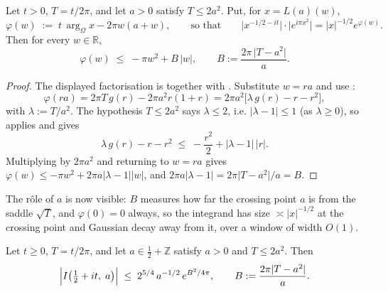 \begin{lemma}
\label{lem:rs_phase_bound}
\leanok
{}
Let $t>0$, $T=t/2\pi$, and let $a>0$ satisfy $T\le2a^{2}$.  Put, for $x=L(a)(w)$,
\[
  \varphi(w)\;:=\;t\,\arg_{\Omega}x-2\pi w(a+w),
  \qquad\text{so that}\qquad
  \bigl|x^{-1/2-it}\bigr|\cdot\bigl|e^{i\pi x^{2}}\bigr|=\lvert x\rvert^{-1/2}e^{\varphi(w)} .
\]
Then for every $w\in\mathbb{R}$,
\[
  \varphi(w)\;\le\;-\pi w^{2}+B\,\lvert w\rvert,
  \qquad B:=\frac{2\pi\,\lvert T-a^{2}\rvert}{a}.
\]
\end{lemma}

\begin{proof}
\leanok
The displayed factorisation is  together with
.  Substitute $w=ra$ and use :
\[
  \varphi(ra)=2\pi T\,g(r)-2\pi a^{2}r(1+r)
  =2\pi a^{2}\bigl[\lambda\,g(r)-r-r^{2}\bigr],
\]
with $\lambda:=T/a^{2}$.  The hypothesis $T\le2a^{2}$ says $\lambda\le2$, i.e.
$\lvert\lambda-1\rvert\le1$ (as $\lambda\ge0$), so  applies
and gives
\[
  \lambda\,g(r)-r-r^{2}\;\le\;-\frac{r^{2}}2+\lvert\lambda-1\rvert\,\lvert r\rvert .
\]
Multiplying by $2\pi a^{2}$ and returning to $w=ra$ gives
$\varphi(w)\le-\pi w^{2}+2\pi a\lvert\lambda-1\rvert\lvert w\rvert$, and
$2\pi a\lvert\lambda-1\rvert=2\pi\lvert T-a^{2}\rvert/a=B$.
\end{proof}

The rôle of $a$ is now visible: $B$ measures how far the crossing point $a$ is from the
saddle $\sqrt T$, and $\varphi(0)=0$ always, so the integrand has size $\asymp|x|^{-1/2}$
at the crossing point and Gaussian decay away from it, over a window of width $O(1)$.

\begin{theorem}
\label{thm:rs_remainder_bound}
\leanok
{}
Let $t\ge0$, $T=t/2\pi$, and let $a\in\tfrac12+\mathbb{Z}$ satisfy $a>0$ and $T\le2a^{2}$.  Then
\[
  \Bigl|I\bigl(\tfrac12+it,\;a\bigr)\Bigr|\;\le\;2^{5/4}\,a^{-1/2}\,e^{B^{2}/4\pi},
  \qquad B:=\frac{2\pi\lvert T-a^{2}\rvert}{a}.
\]
\end{theorem}

